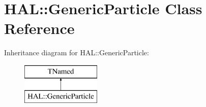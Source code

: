\hypertarget{class_h_a_l_1_1_generic_particle}{\section{H\-A\-L\-:\-:Generic\-Particle Class Reference}
\label{class_h_a_l_1_1_generic_particle}
}
Inheritance diagram for H\-A\-L\-:\-:Generic\-Particle\-:\begin{figure}[H]
\begin{center}
\leavevmode
\includegraphics[height=2.000000cm]{class_h_a_l_1_1_generic_particle}
\end{center}
\end{figure}
